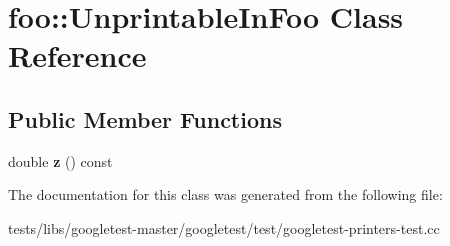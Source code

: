 \hypertarget{classfoo_1_1UnprintableInFoo}{}\section{foo\+:\+:Unprintable\+In\+Foo Class Reference}
\label{classfoo_1_1UnprintableInFoo}
\subsection*{Public Member Functions}
\begin{DoxyCompactItemize}
\item 
\mbox{\label{classfoo_1_1UnprintableInFoo_a3dc8c8e90906bb6f3376474d545e488c}} 
double {\bfseries z} () const
\end{DoxyCompactItemize}


The documentation for this class was generated from the following file\+:\begin{DoxyCompactItemize}
\item 
tests/libs/googletest-\/master/googletest/test/googletest-\/printers-\/test.\+cc\end{DoxyCompactItemize}
